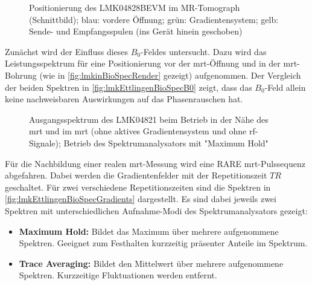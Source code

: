 \begin{figure}[H]
	\centering
	\caption[LMK04821 Position in Tomograph]{Positionierung des LMK04828BEVM im MR-Tomograph (Schnittbild); blau: vordere Öffnung; grün: Gradientensystem; gelb: Sende- und Empfangsspulen (ins Gerät hinein geschoben)}
	\label{fig:lmkinBioSpecRender}
\end{figure}

Zunächst wird der Einfluss dieses $B_0$-Feldes untersucht. Dazu wird das Leistungsspektrum für eine Positionierung vor der \gls{mrt}-Öffnung und in der \gls{mrt}-Bohrung (wie in \autoref{fig:lmkinBioSpecRender} gezeigt) aufgenommen. Der Vergleich der beiden Spektren in \autoref{fig:lmkEttlingenBioSpecB0} zeigt, dass das $B_0$-Feld allein keine nachweisbaren Auswirkungen auf das Phasenrauschen hat.

\begin{figure}[H]
	\centering
	\caption[]{Ausgangsspektrum des LMK04821 beim Betrieb in der Nähe des \gls{mrt} und im \gls{mrt} (ohne aktives Gradientensystem und ohne \gls{rf}-Signale); Betrieb des Spektrumanalysators mit "Maximum Hold"}
	\label{fig:lmkEttlingenBioSpecB0}
\end{figure}

Für die Nachbildung einer realen \gls{mrt}-Messung wird eine RARE \gls{mrt}-Pulssequenz abgefahren. Dabei werden die Gradientenfelder mit der Repetitionszeit $TR$ geschaltet. Für zwei verschiedene Repetitionszeiten sind die Spektren in \autoref{fig:lmkEttlingenBioSpecGradients} dargestellt. Es sind dabei jeweils zwei Spektren mit unterschiedlichen Aufnahme-Modi des Spektrumanalysators gezeigt:
\begin{itemize}
	\item \textbf{Maximum Hold:} Bildet das Maximum über mehrere aufgenommene Spektren. Geeignet zum Festhalten kurzzeitig präsenter Anteile im Spektrum.
	\item \textbf{Trace Averaging:} Bildet den Mittelwert über mehrere aufgenommene Spektren. Kurzzeitige Fluktuationen werden entfernt.
\end{itemize}

